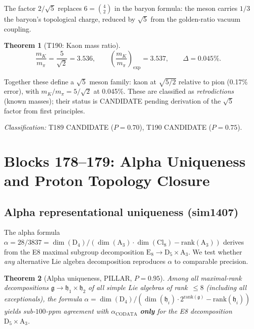 \documentclass[aps,prd,twocolumn,superscriptaddress,floatfix,nofootinbib]{revtex4-2}
\newtheorem{theorem}{Theorem}
\theoremstyle{definition}
\theoremstyle{remark}
\begin{document}
\noindent
The factor $2/\sqrt{5}$ replaces $6 = \binom{4}{2}$ in the baryon
formula: the meson carries $1/3$ the baryon's topological charge, reduced
by $\sqrt{5}$ from the golden-ratio vacuum coupling.

\begin{theorem}[T190: Kaon mass ratio]
\begin{equation}
\frac{m_K}{m_\pi} = \frac{5}{\sqrt{2}} = 3.536,
\qquad \left(\frac{m_K}{m_\pi}\right)_{\!\mathrm{exp}} = 3.537,
\qquad \Delta = 0.045\%.
\end{equation}
\end{theorem}

\noindent
Together these define a $\sqrt{5}$ meson family: kaon at $\sqrt{5/2}$
relative to pion (0.17\% error), with $m_K/m_\pi = 5/\sqrt{2}$ at
0.045\%.  These are classified as \emph{retrodictions} (known masses);
their status is CANDIDATE pending derivation of the $\sqrt{5}$ factor
from first principles.

\noindent\textit{Classification:} T189 CANDIDATE ($P{=}0.70$),
T190 CANDIDATE ($P{=}0.75$).

\section{Blocks 178--179: Alpha Uniqueness and Proton Topology Closure}
\label{sec:blocks178-179}

\subsection{Alpha representational uniqueness (sim1407)}
\label{sec:alpha-uniqueness}

The alpha formula $\alpha = 28/3837 = \dim(\mathrm{D}_4)/(\dim(\mathrm{A}_3)\cdot\dim(\mathrm{Cl}_8) - \mathrm{rank}(\mathrm{A}_3))$ derives from the E8 maximal subgroup decomposition $\mathrm{E}_8 \to \mathrm{D}_5 \times \mathrm{A}_3$.  We test whether \emph{any} alternative Lie algebra decomposition reproduces $\alpha$ to comparable precision.

\begin{theorem}[Alpha uniqueness, PILLAR, $P{=}0.95$]
Among all maximal-rank decompositions $\mathfrak{g} \to \mathfrak{h}_1 \times \mathfrak{h}_2$ of all simple Lie algebras of rank~$\le 8$ (including all exceptionals), the formula $\alpha = \dim(\mathrm{D}_4)/(\dim(\mathfrak{h}_i)\cdot 2^{\mathrm{rank}(\mathfrak{g})} - \mathrm{rank}(\mathfrak{h}_i))$ yields sub-$100$-ppm agreement with $\alpha_{\mathrm{CODATA}}$ \textbf{only} for the E8 decomposition $\mathrm{D}_5 \times \mathrm{A}_3$.
\end{theorem}
\end{document}
